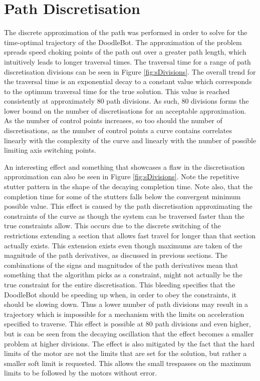 \section{Path Discretisation}
The discrete approximation of the path was performed in order to solve for the time-optimal trajectory of the DoodleBot. The approximation of the problem spreads speed choking points of the path out over a greater path length, which intuitively leads to longer traversal times. The traversal time for a range of path discretisation divisions can be seen in Figure \ref{fig:sDivisions}. The overall trend for the traversal time is an exponential decay to a constant value which corresponds to the optimum traversal time for the true solution. This value is reached consistently at approximately 80 path divisions. As such, 80 divisions forms the lower bound on the number of discretisations for an acceptable approximation. As the number of control points increases, so too should the number of discretisations, as the number of control points a curve contains correlates linearly with the complexity of the curve and linearly with the number of possible limiting axis switching points.

An interesting effect and something that showcases a flaw in the discretisation approximation can also be seen in Figure \ref{fig:sDivisions}. Note the repetitive stutter pattern in the shape of the decaying completion time. Note also, that the completion time for some of the stutters falls below the convergent minimum possible value. This effect is caused by the path discretisation approximating the constraints of the curve as though the system can be traversed faster than the true constraints allow. This occurs due to the discrete switching of the restrictions extending a section that allows fast travel for longer than that section actually exists. This extension exists even though maximums are taken of the magnitude of the path derivatives, as discussed in previous sections. The combinations of the signs and magnitudes of the path derivatives mean that something that the algorithm picks as a constraint, might not actually be the true constraint for the entire discretisation. This bleeding specifies that the DoodleBot should be speeding up when, in order to obey the constraints, it should be slowing down. Thus a lower number of path divisions may result in a trajectory which is impossible for a mechanism with the limits on acceleration specified to traverse. This effect is possible at 80 path divisions and even higher, but is can be seen from the decaying oscillation that the effect becomes a smaller problem at higher divisions. The effect is also mitigated by the fact that the hard limits of the motor are not the limits that are set for the solution, but rather a smaller soft limit is requested. This allows the small trespasses on the maximum limits to be followed by the motors without error.


